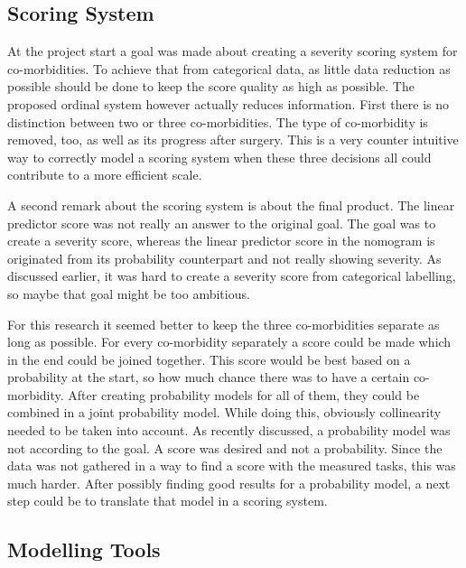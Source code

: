 \documentclass[10pt,a4paper]{report}
\begin{document}
	\subsection{Scoring System}
	
	At the project start a goal was made about creating a severity scoring system for co-morbidities. To achieve that from categorical data, as little data reduction as possible should be done to keep the score quality as high as possible. The proposed ordinal system however actually reduces information. First there is no distinction between two or three co-morbidities. The type of co-morbidity is removed, too, as well as its progress after surgery. This is a very counter intuitive way to correctly model a scoring system when these three decisions all could contribute to a more efficient scale.
	
	A second remark about the scoring system is about the final product. The linear predictor score was not really an answer to the original goal. The goal was to create a severity score, whereas the linear predictor score in the nomogram is originated from its probability counterpart and not really showing severity. As discussed earlier, it was hard to create a severity score from categorical labelling, so maybe that goal might be too ambitious. %
	
	For this research it seemed better to keep the three co-morbidities separate as long as possible. For every co-morbidity separately a score could be made which in the end could be joined together. This score would be best based on a probability at the start, so how much chance there was to have a certain co-morbidity. After creating probability models for all of them, they could be combined in a joint probability model. While doing this, obviously collinearity needed to be taken into account. As recently discussed, a probability model was not according to the goal. A score was desired and not a probability. Since the data was not gathered in a way to find a score with the measured tasks, this was much harder. After possibly finding good results for a probability model, a next step could be to translate that model in a scoring system.
	
	\subsection{Modelling Tools}
	
\end{document}

